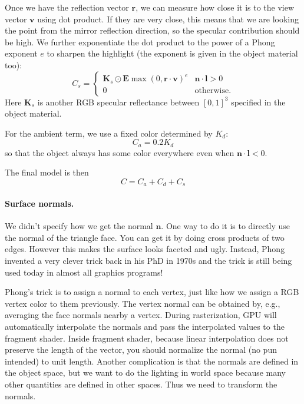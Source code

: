 Once we have the reflection vector $\mathbf{r}$, we can measure how close it is to the view vector $\mathbf{v}$ using dot product. If they are very close, this means that we are looking the point from the mirror reflection direction, so the specular contribution should be high. We further exponentiate the dot product to the power of a Phong exponent $e$ to sharpen the highlight (the exponent is given in the object material too):
\begin{equation}
C_{s} = 
\begin{cases}
    \mathbf{K}_s \odot \mathbf{E} \max\left(0, \mathbf{r} \cdot \mathbf{v}\right)^e & \mathbf{n} \cdot \mathbf{l} > 0 \\
    0 & \text{otherwise}.
\end{cases}
\end{equation}
Here $\mathbf{K}_s$ is another RGB specular reflectance between $[0, 1]^3$ specified in the object material.

For the ambient term, we use a fixed color determined by $K_d$:
\begin{equation}
    C_a = 0.2 K_d
\end{equation}
so that the object always has some color everywhere even when $\mathbf{n} \cdot \mathbf{l} < 0$.

The final model is then
\begin{equation}
    C = C_a + C_d + C_s
\end{equation}

\paragraph{Surface normals.} We didn't specify how we get the normal $\mathbf{n}$. One way to do it is to directly use the normal of the triangle face. You can get it by doing cross products of two edges. However this makes the surface looks faceted and ugly. Instead, Phong invented a very clever trick back in his PhD in 1970s and the trick is still being used today in almost all graphics programs! 

Phong's trick is to assign a normal to each vertex, just like how we assign a RGB vertex color to them previously. The vertex normal can be obtained by, e.g., averaging the face normals nearby a vertex.
During rasterization, GPU will automatically interpolate the normals and pass the interpolated values to the fragment shader. 
Inside fragment shader, because linear interpolation does not preserve the length of the vector, you should normalize the normal (no pun intended) to unit length. 
Another complication is that the normals are defined in the object space, but we want to do the lighting in world space because many other quantities are defined in other spaces. Thus we need to transform the normals.


